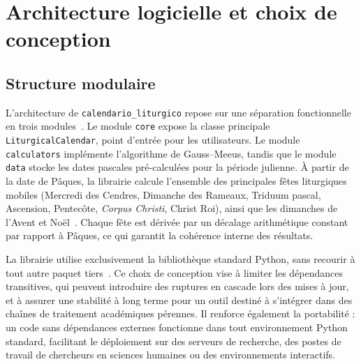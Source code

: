 \documentclass[final, fra]{anthology-ch}     %
\begin{document}
\section{Architecture logicielle et choix de conception} \label{sec:architecture}

\subsection{Structure modulaire} \label{sec:modules}

L'architecture de \texttt{calendario\_liturgico} repose sur une séparation fonctionnelle en trois modules~\cite{echavarria2025github}. Le module \texttt{core} expose la classe principale \texttt{LiturgicalCalendar}, point d'entrée pour les utilisateurs. Le module \texttt{calculators} implémente l'algorithme de Gauss--Meeus, tandis que le module \texttt{data} stocke les dates pascales pré-calculées pour la période julienne. À partir de la date de Pâques, la librairie calcule l'ensemble des principales fêtes liturgiques mobiles (Mercredi des Cendres, Dimanche des Rameaux, Triduum pascal, Ascension, Pentecôte, \textit{Corpus Christi}, Christ Roi), ainsi que les dimanches de l'Avent et Noël~\cite{echavarria2025pypi}. Chaque fête est dérivée par un décalage arithmétique constant par rapport à Pâques, ce qui garantit la cohérence interne des résultats.


La librairie utilise exclusivement la bibliothèque standard Python, sans recourir à tout autre paquet tiers~\cite{echavarria2025pypi}. Ce choix de conception vise à limiter les dépendances transitives, qui peuvent introduire des ruptures en cascade lors des mises à jour, et à assurer une stabilité à long terme pour un outil destiné à s'intégrer dans des chaînes de traitement académiques pérennes. Il renforce également la portabilité : un code sans dépendances externes fonctionne dans tout environnement Python standard, facilitant le déploiement sur des serveurs de recherche, des postes de travail de chercheurs en sciences humaines ou des environnements interactifs.

\end{document}
